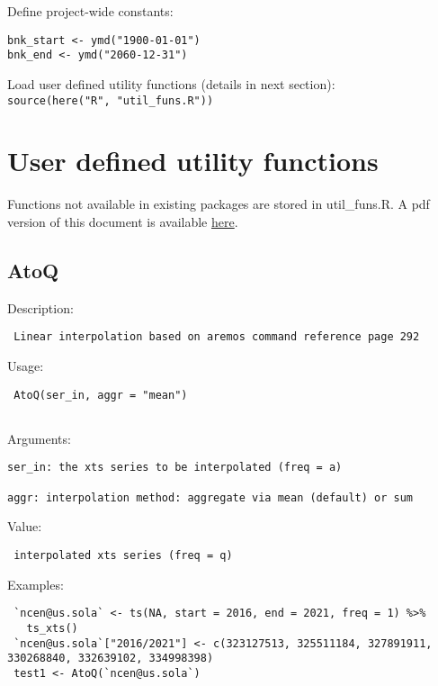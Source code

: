 \documentclass[
  letterpaper,
  DIV=11,
  numbers=noendperiod]{scrreport}
\begin{document}
Define project-wide constants:

\begin{verbatim}
bnk_start <- ymd("1900-01-01")
bnk_end <- ymd("2060-12-31")
\end{verbatim}

Load user defined utility functions (details in next section):\\
\texttt{source(here("R",\ "util\_funs.R"))}


\hypertarget{user-defined-utility-functions}{%
\chapter{User defined utility
functions}\label{user-defined-utility-functions}}

Functions not available in existing packages are stored in util\_funs.R.
A pdf version of this document is available \href{util_funs.pdf}{here}.

\hypertarget{atoq}{%
\section{AtoQ}\label{atoq}}

Description:

\begin{verbatim}
 Linear interpolation based on aremos command reference page 292
\end{verbatim}

Usage:

\begin{verbatim}
 AtoQ(ser_in, aggr = "mean")
 
\end{verbatim}

Arguments:

\begin{verbatim}
ser_in: the xts series to be interpolated (freq = a)

aggr: interpolation method: aggregate via mean (default) or sum
\end{verbatim}

Value:

\begin{verbatim}
 interpolated xts series (freq = q)
\end{verbatim}

Examples:

\begin{verbatim}
 `ncen@us.sola` <- ts(NA, start = 2016, end = 2021, freq = 1) %>% 
   ts_xts()
 `ncen@us.sola`["2016/2021"] <- c(323127513, 325511184, 327891911, 330268840, 332639102, 334998398)
 test1 <- AtoQ(`ncen@us.sola`)
 
\end{verbatim}
\end{document}
